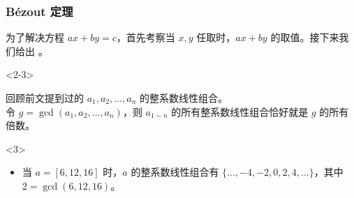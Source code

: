 \documentclass{../pkslide}
\begin{document}
\begin{frame}
  \frametitle{Bézout 定理}
  为了解决方程 $a x + b y = c$，首先考察当 $x, y$ 任取时，$a x + b y$ 的取值。接下来我们给出 。
  
  \begin{uncoverenv}<2-3>
    \begin{theorem}[Bézout 定理]
      回顾前文提到过的 $a_1, a_2, \ldots, a_n$ 的整系数线性组合。\\
      令 $g = \gcd(a_1, a_2, \ldots, a_n)$，则 $a_{1 \sim n}$ 的所有整系数线性组合恰好就是 $g$ 的所有倍数。
    \end{theorem}
  \end{uncoverenv}
  
  \begin{uncoverenv}<3>
    \begin{examples}[Bézout 定理]
      \begin{itemize}
        \item 当 $a = [ 6, 12, 16 ]$ 时，$a$ 的整系数线性组合有 $\{ \ldots, -4, -2, 0, 2, 4, \ldots \}$，其中 $2 = \gcd(6, 12, 16)$。
      \end{itemize}
    \end{examples}
  \end{uncoverenv}
\end{frame}
\end{document}
